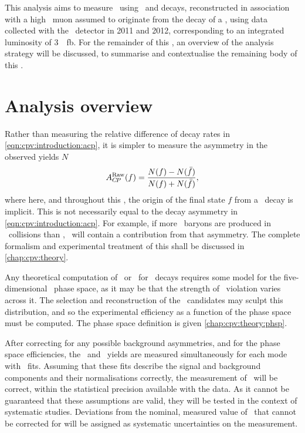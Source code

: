 This analysis aims to measure \dACP\ using \LcTopKK\ and \LcToppipi decays, 
reconstructed in association with a high \pT\ muon assumed to originate from 
the decay of a \PLambdab, using data collected with the \lhcb\ detector in 2011 
and 2012, corresponding to an integrated luminosity of \SI{3}{\per\femto\barn}.
For the remainder of this , an overview of the 
analysis strategy will be discussed, to summarise and contextualise the 
remaining body of this .

\section{Analysis overview}
\label{chap:cpv:introduction:overview}

Rather than measuring the relative difference of decay rates in 
\cref{eqn:cpv:introduction:acp}, it is simpler to measure the asymmetry in the 
observed yields $N$
\begin{equation}
  A_{C\!P}^{\textnormal{Raw}}(f) = \frac{N(f) - N(\bar{f})}{N(f) + N(\bar{f})},
  \label{eqn:cpv:introduction:araw}
\end{equation}
where here, and throughout this , the origin of the final 
state $f$ from a \PLambdac\ decay is implicit.\footnotemark
This is not necessarily equal to the decay asymmetry in 
\cref{eqn:cpv:introduction:acp}.
For example, if more \PLambdab\ baryons are produced in \pp\ collisions than 
\APLambdab, \ARaw\ will contain a contribution from that asymmetry.
The complete formalism and experimental treatment of this shall be discussed in 
\cref{chap:cpv:theory}.


Any theoretical computation of \ACP\ or \dACP\ for \LcTophh\ decays requires 
some model for the five-dimensional \phh\ phase space, as it may be that the 
strength of \CP\ violation varies across it.
The selection and reconstruction of the \PLambdac\ candidates may sculpt this 
distribution, and so the experimental efficiency as a function of the phase 
space must be computed.
The phase space definition is given \cref{chap:cpv:theory:phsp}.

After correcting for any possible background asymmetries, and for the phase 
space efficiencies, the \PLambdac\ and \APLambdac\ yields are measured 
simultaneously for each mode with \chisq\ fits.
Assuming that these fits describe the signal and background components and 
their normalisations correctly, the measurement of \dACP\ will be correct, 
within the statistical precision available with the data.
As it cannot be guaranteed that these assumptions are valid, they will be 
tested in the context of systematic studies.
Deviations from the nominal, measured value of \dACP\ that cannot be corrected 
for will be assigned as systematic uncertainties on the measurement.

